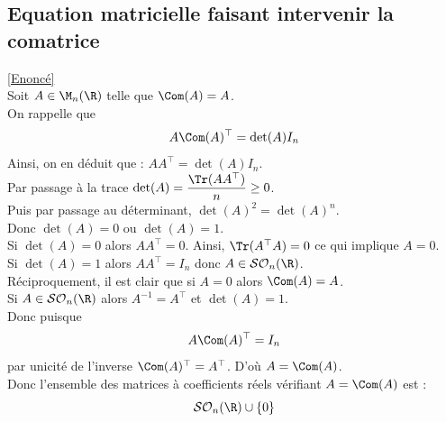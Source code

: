 \documentclass[8pt]{book}
\begin{document}
	\subsection{Equation matricielle faisant intervenir la comatrice }
	\label{Equation matricielle faisant intervenir la comatrice corrigé}
	\textcolor{blue}{\hyperref[Equation matricielle faisant intervenir la comatrice]{[Enoncé]}}\\
	Soit $A\in\M_n(\R)$ telle que $\Com(A)=A$.\\
	On rappelle que \[A\Com(A)^\top=\det(A)I_n\]
	Ainsi, on en déduit que : $AA^\top=\det(A)I_n$.\\
	Par passage à la trace $\det(A)=\dfrac{\Tr(AA^\top)}{n}\geq 0$.\\
	Puis par passage au déterminant, $\det(A)^2=\det(A)^n$.\\
	Donc $\det(A)=0$ ou $\det(A)=1$.\\
	\textbullet Si $\det(A)=0$ alors $AA^\top=0$. Ainsi, $\Tr(A^\top A)=0$ ce qui implique $A=0$.\\
	\textbullet Si $\det(A)=1$ alors $AA^\top=I_n$ donc $A\in\mathcal{SO}_n(\R)$.\\
	Réciproquement, il est clair que si $A=0$ alors $\Com(A)=A$.\\
	Si $A\in\mathcal{SO}_n(\R)$ alors $A^{-1}=A^\top$ et $\det(A)=1$.\\ 
	Donc puisque \[A\Com(A)^\top=I_n\] par unicité de l'inverse $\Com(A)^\top=A^\top$.
	D'où $A=\Com(A)$.\\
	Donc l'ensemble des matrices à coefficients réels vérifiant $A=\Com(A)$ est : \[\mathcal{SO}_n(\R)\cup\{0\}\]
	
\end{document}
